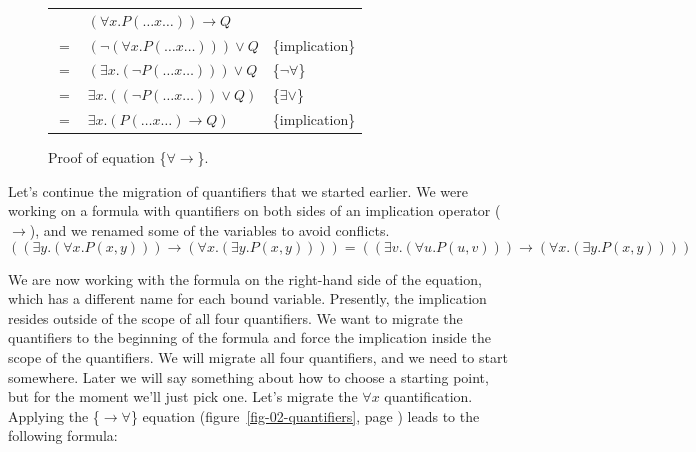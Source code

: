 {{\begin{figure}
\begin{center}
\begin{tabular}{cll}
   & $(\forall x.P(\dots x \dots)) \rightarrow Q$ & \\
$=$&  $(\neg(\forall x.P(\dots x \dots))) \vee Q$ & \{implication\}\\
$=$& $(\exists x.(\neg P(\dots x \dots))) \vee Q$ & \{$\neg\forall$\}\\
$=$&  $\exists x.((\neg P(\dots x \dots)) \vee Q)$& \{$\exists\vee$\}\\
$=$&  $\exists x.(P(\dots x \dots) \rightarrow Q)$& \{implication\}\\
\end{tabular}
\end{center}
\caption{Proof of equation \{${\forall}{\rightarrow}$\}.}
\label{fig:quantifier-negation}
\end{figure}


Let's continue the migration of quantifiers that
we started earlier.
We were working on a formula with quantifiers on both sides
of an implication operator ($\rightarrow$), and
we renamed some of the variables to avoid conflicts.
$$((\exists y.(\forall x.P(x, y))) \rightarrow (\forall x.(\exists y.P(x, y)))) =
((\exists v.(\forall u.P(u, v))) \rightarrow (\forall x.(\exists y.P(x, y))))$$

We are now working with the formula on the right-hand side of the equation,
which has a different name for each bound variable.
Presently, the implication resides
outside of the scope of all four quantifiers.
We want to migrate the quantifiers to the beginning of the formula
and force the implication inside the scope of the quantifiers.
We will migrate all four quantifiers, and we need to start somewhere.
Later we will say something about how to choose a starting point,
but for the moment we'll just pick one.
Let's migrate the $\forall x$ quantification.
Applying the \{${\rightarrow}{\forall}$\} equation
(figure~\ref{fig-02-quantifiers}, page \pageref{fig-02-quantifiers})
leads to the following formula:

}}
